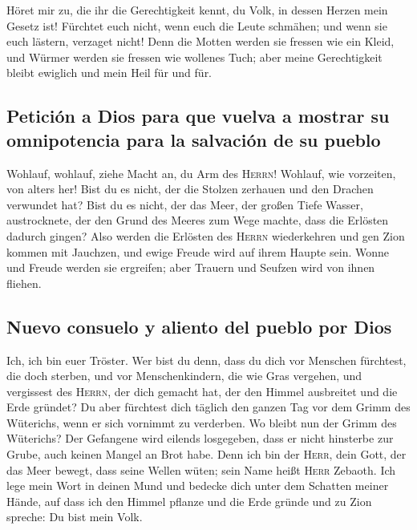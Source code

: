  Höret mir zu, die ihr die Gerechtigkeit kennt, du Volk,
in dessen Herzen mein Gesetz ist! Fürchtet euch nicht, wenn euch die
Leute schmähen; und wenn sie euch lästern, verzaget nicht!
 Denn die Motten werden sie fressen wie ein Kleid, und
Würmer werden sie fressen wie wollenes Tuch; aber meine Gerechtigkeit
bleibt ewiglich und mein Heil für und für.

\hypertarget{peticiuxf3n-a-dios-para-que-vuelva-a-mostrar-su-omnipotencia-para-la-salvaciuxf3n-de-su-pueblo}{%
\subsection{Petición a Dios para que vuelva a mostrar su omnipotencia
para la salvación de su
pueblo}\label{peticiuxf3n-a-dios-para-que-vuelva-a-mostrar-su-omnipotencia-para-la-salvaciuxf3n-de-su-pueblo}}

 Wohlauf, wohlauf, ziehe Macht an, du Arm des
\textsc{Herrn}! Wohlauf, wie vorzeiten, von alters her! Bist du es
nicht, der die Stolzen zerhauen und den Drachen verwundet hat?
 Bist du es nicht, der das Meer, der großen Tiefe Wasser,
austrocknete, der den Grund des Meeres zum Wege machte, dass die
Erlösten dadurch gingen?  Also werden die Erlösten des
\textsc{Herrn} wiederkehren und gen Zion kommen mit Jauchzen, und ewige
Freude wird auf ihrem Haupte sein. Wonne und Freude werden sie
ergreifen; aber Trauern und Seufzen wird von ihnen fliehen.

\hypertarget{nuevo-consuelo-y-aliento-del-pueblo-por-dios}{%
\subsection{Nuevo consuelo y aliento del pueblo por
Dios}\label{nuevo-consuelo-y-aliento-del-pueblo-por-dios}}

 Ich, ich bin euer Tröster. Wer bist du denn, dass du
dich vor Menschen fürchtest, die doch sterben, und vor Menschenkindern,
die wie Gras vergehen,  und vergissest des
\textsc{Herrn}, der dich gemacht hat, der den Himmel ausbreitet und die
Erde gründet? Du aber fürchtest dich täglich den ganzen Tag vor dem
Grimm des Wüterichs, wenn er sich vornimmt zu verderben. Wo bleibt nun
der Grimm des Wüterichs?  Der Gefangene wird eilends
losgegeben, dass er nicht hinsterbe zur Grube, auch keinen Mangel an
Brot habe.  Denn ich bin der \textsc{Herr}, dein Gott,
der das Meer bewegt, dass seine Wellen wüten; sein Name heißt
\textsc{Herr} Zebaoth.  Ich lege mein Wort in deinen Mund
und bedecke dich unter dem Schatten meiner Hände, auf dass ich den
Himmel pflanze und die Erde gründe und zu Zion spreche: Du bist mein
Volk.

